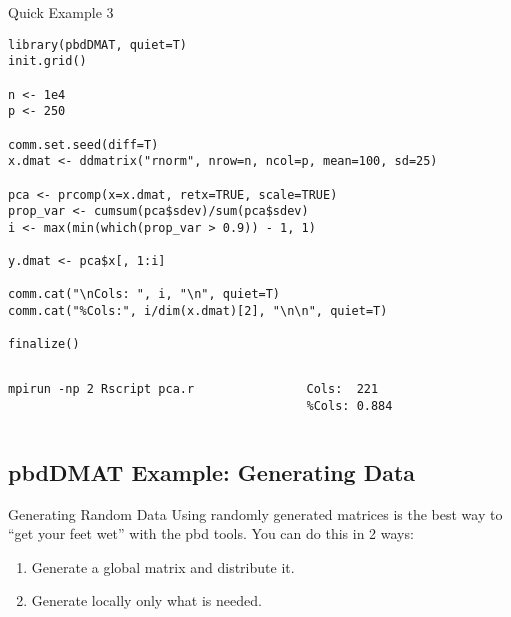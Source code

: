 \begin{frame}[fragile]
\fontsize{8pt}{7.2}\selectfont
  \begin{exampleblock}{Quick Example 3}
\begin{lstlisting}[basicstyle=\tiny,title=\fontsize{8pt}{7.2}\selectfont PCA: pca.r]
library(pbdDMAT, quiet=T)
init.grid()

n <- 1e4
p <- 250

comm.set.seed(diff=T)
x.dmat <- ddmatrix("rnorm", nrow=n, ncol=p, mean=100, sd=25)

pca <- prcomp(x=x.dmat, retx=TRUE, scale=TRUE)
prop_var <- cumsum(pca$sdev)/sum(pca$sdev)
i <- max(min(which(prop_var > 0.9)) - 1, 1)

y.dmat <- pca$x[, 1:i]

comm.cat("\nCols: ", i, "\n", quiet=T)
comm.cat("%Cols:", i/dim(x.dmat)[2], "\n\n", quiet=T)

finalize()
\end{lstlisting}
\vspace{-.4cm}
  \begin{columns}[t,onlytextwidth]
    \begin{column}{0.58\textwidth}
\begin{lstlisting}[basicstyle=\tiny,backgroundcolor=\color{white},keywordstyle=\color{black},title=\fontsize{6pt}{7.2}\selectfont Execute this script via:]
mpirun -np 2 Rscript pca.r
\end{lstlisting}    
    \end{column}
    \hfill
    \begin{column}{0.4\textwidth}
\begin{lstlisting}[basicstyle=\tiny,title=\fontsize{6pt}{7.2}\selectfont Sample Output:]
Cols:  221 
%Cols: 0.884 
\end{lstlisting}
    \end{column}
​  \end{columns}
  \end{exampleblock}
\end{frame}






\subsection{pbdDMAT Example: Generating Data}

\begin{frame}
  \begin{block}{Generating Random Data}\pause
    Using randomly generated matrices is the best way to ``get your feet wet'' with the pbd tools.  You can do this in 2 ways:
    \begin{enumerate}
     \item Generate a global matrix and distribute it.
     \item Generate locally only what is needed.
    \end{enumerate}
  \end{block}
\end{frame}

